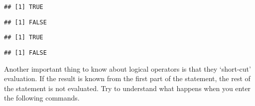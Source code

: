 \documentclass[paper=a4,10pt,div=17,headsepline,BCOR=12mm,twoside,open=right]{scrbook}\usepackage{knitr}
\begin{document}
\begin{knitrout}\footnotesize
{}\color{fgcolor}\begin{kframe}
\begin{alltt}
\end{alltt}
\begin{verbatim}
## [1] TRUE
\end{verbatim}
\begin{alltt}
\end{alltt}
\begin{verbatim}
## [1] FALSE
\end{verbatim}
\begin{alltt}
 \hlopt{&} 
\end{alltt}
\begin{verbatim}
## [1] TRUE
\end{verbatim}
\begin{alltt}
 \hlopt{&} 
\end{alltt}
\begin{verbatim}
## [1] FALSE
\end{verbatim}
\end{kframe}
\end{knitrout}

Another important thing to know about logical operators is that they `short-cut' evaluation. If the result is known from the first part of the statement, the rest of the statement is not evaluated. Try to understand what happens when you enter the following commands.
\end{document}
